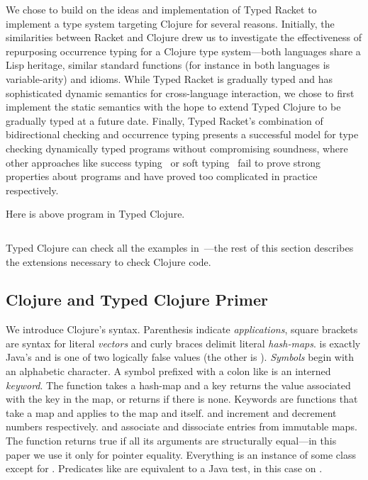 We chose to build on the ideas and implementation
of Typed Racket to implement a type system targeting Clojure for several reasons.
Initially, the similarities between Racket and Clojure drew us to
investigate the effectiveness of repurposing occurrence typing
for a Clojure type system---both languages share a Lisp heritage,
similar standard functions 
(for instance 
in both languages is variable-arity)
and idioms.
While Typed Racket is gradually typed and has sophisticated
dynamic semantics for cross-language interaction, we 
chose to first implement
the static semantics
with the hope to extend Typed Clojure to be gradually typed at a future date.
Finally,
Typed Racket's combination of bidirectional checking
and occurrence typing presents a successful model for 
type checking dynamically typed programs without compromising
soundness, where other approaches like success typing~\cite{todo-dialyzer-paper}
or soft typing~\cite{successtyping-todo}
fail to prove strong properties about programs
and have proved too complicated in practice respectively.

Here is above program in Typed Clojure.

\begin{exmp}
\inputminted[firstline=1]{clojure}{code/demo/src/demo/eg1.clj}
\label{example:conditionalflow}
\end{exmp}

Typed Clojure can check all the examples in~\citet{TF10}---the 
rest of this section describes the extensions necessary
to check Clojure code.

\subsection{Clojure and Typed Clojure Primer}

We introduce Clojure's syntax.
Parenthesis indicate \emph{applications}, square brackets
are syntax for literal \emph{vectors} and curly braces delimit literal
\emph{hash-maps}.
 is exactly Java's  and is one of two logically
false values (the other is ).
\emph{Symbols} begin with an alphabetic character.
A symbol prefixed with a colon like  is an interned \emph{keyword}.
The  function takes a hash-map and a key returns the value
associated with the key in the map, or returns  if there is none.
Keywords are functions that take a map and applies  to the map
and itself.
 and  increment and decrement numbers respectively.
 and  associate and dissociate entries
from immutable maps.
The \clj{=} function returns true if all its arguments are structurally equal---in this
paper we use it only for pointer equality.
Everything is an instance of some class
except for . Predicates like  are equivalent to
a Java  test, in this case on .

